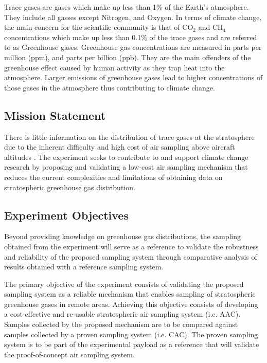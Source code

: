 \documentclass[a4paper,12pt,twoside]{article}
\begin{document}
Trace gases are gases which make up less than 1\% of the Earth's atmosphere. They include all gasses except Nitrogen, and Oxygen. In terms of climate change, the main concern for the scientific community is that of CO$_2$ and CH$_4$ concentrations which make up less than 0.1\% of the trace gases and are referred to as Greenhouse gases. Greenhouse gas concentrations are measured in parts per million (ppm), and parts per billion (ppb). They are the main offenders of the greenhouse effect caused by human activity as they trap heat into the atmosphere. Larger emissions of greenhouse gases lead to higher concentrations of those gases in the atmosphere thus contributing to climate change.

\subsection{Mission Statement}

There is little information on the distribution of trace gases at the stratosphere due to the inherent difficulty and high cost of air sampling above aircraft altitudes \cite{Trace}. The experiment seeks to contribute to and support climate change research by proposing and validating a low-cost air sampling mechanism that reduces the current complexities and limitations of obtaining data on stratospheric greenhouse gas distribution.
\pagebreak
\subsection{Experiment Objectives}

Beyond providing knowledge on greenhouse gas distributions, the sampling obtained from the experiment will serve as a reference to validate the robustness and reliability of the proposed sampling system through comparative analysis of results obtained with a reference sampling system.

The primary objective of the experiment consists of validating the proposed sampling system as a reliable mechanism that enables sampling of stratospheric greenhouse gases in remote areas. Achieving this objective consists of developing a cost-effective and re-usable stratospheric air sampling system (i.e. AAC). Samples collected by the proposed mechanism are to be compared against samples collected by a proven sampling system (i.e. CAC). The proven sampling system is to be part of the experimental payload as a reference that will validate the proof-of-concept air sampling system.
\end{document}
